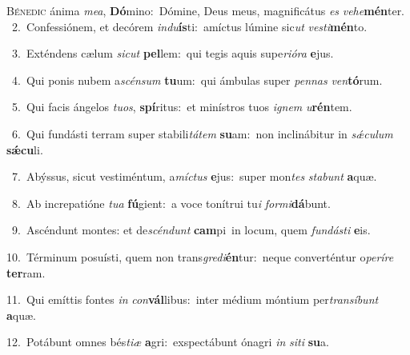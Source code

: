 \lettrine{\initial\textcolor{\initialcolor}{B}}{énedic} ánima \textit{me}\-\textit{a}, \textbf{Dó}\-mino:~\star Dómine, Deus meus, magnificátus \textit{es} \textit{ve}\-\textit{he}\textbf{mén}ter.\\
{\numbfont\textcolor{\numbcolor}{~2.}}~Confessiónem, et decórem \textit{ind}\-\textit{u}\textbf{ís}ti:~\star amíctus lúmine sic\textit{ut} \textit{ves}\-\textit{ti}\textbf{mén}to.\par
{\numbfont\textcolor{\numbcolor}{~3.}}~Exténdens cælum \textit{sic}\-\textit{ut} \textbf{pel}\-lem:~\star qui tegis aquis supe\-\textit{ri}\-\textit{ó}\textit{ra} \textbf{e}\-jus.\par
{\numbfont\textcolor{\numbcolor}{~4.}}~Qui ponis nubem a\-\textit{scén}\-\textit{sum} \textbf{tu}\-um:~\star qui ámbulas super \textit{pen}\-\textit{nas} \textit{ven}\-\textbf{tó}rum.\par
{\numbfont\textcolor{\numbcolor}{~5.}}~Qui facis ángelos \textit{tu}\-\textit{os}, \textbf{spí}\-ritus:~\star et minístros tuos \textit{i}\-\textit{gnem} \textit{u}\-\textbf{rén}tem.\par
{\numbfont\textcolor{\numbcolor}{~6.}}~Qui fundásti terram super stabili\-\textit{tá}\-\textit{tem} \textbf{su}\-am:~\star non inclinábitur in \textit{sǽ}\-\textit{cu}\textit{lum} \textbf{sǽ}\-\textbf{cu}li.\par
{\numbfont\textcolor{\numbcolor}{~7.}}~Abýssus, sicut vestiméntum, a\-\textit{míc}\-\textit{tus} \textbf{e}\-jus:~\star super mon\textit{tes} \textit{sta}\-\textit{bunt} \textbf{a}\-quæ.\par
{\numbfont\textcolor{\numbcolor}{~8.}}~Ab increpatióne \textit{tu}\-\textit{a} \textbf{fú}\-gient:~\star a voce tonítrui tu\textit{i} \textit{for}\-\textit{mi}\textbf{dá}bunt.\par
{\numbfont\textcolor{\numbcolor}{~9.}}~Ascéndunt montes: et de\-\textit{scén}\-\textit{dunt} \textbf{cam}\-pi~\star in locum, quem \textit{fun}\-\textit{dás}\textit{ti} \textbf{e}\-is.\par
{\numbfont\textcolor{\numbcolor}{10.}}~Términum posuísti, quem non trans\-\textit{gre}\-\textit{di}\textbf{én}tur:~\star neque converténtur o\-\textit{pe}\-\textit{rí}\textit{re} \textbf{ter}\-ram.\par
{\numbfont\textcolor{\numbcolor}{11.}}~Qui emíttis fontes \textit{in} \textit{con}\-\textbf{vál}libus:~\star inter médium móntium per\-\textit{trans}\-\textit{í}\textit{bunt} \textbf{a}\-quæ.\par
{\numbfont\textcolor{\numbcolor}{12.}}~Potábunt omnes bés\-\textit{ti}\-\textit{æ} \textbf{a}\-gri:~\star exspectábunt ónagri \textit{in} \textit{si}\-\textit{ti} \textbf{su}\-a.\par
